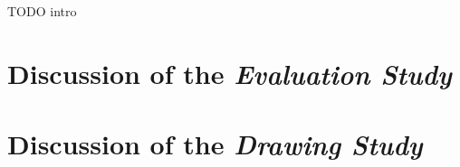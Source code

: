 TODO intro

\section{Discussion of the \textit{Evaluation Study}}
\label{ch:discussionEvaluation}



\section{Discussion of the \textit{Drawing Study}}
\label{ch:DiscussionDrawing}

